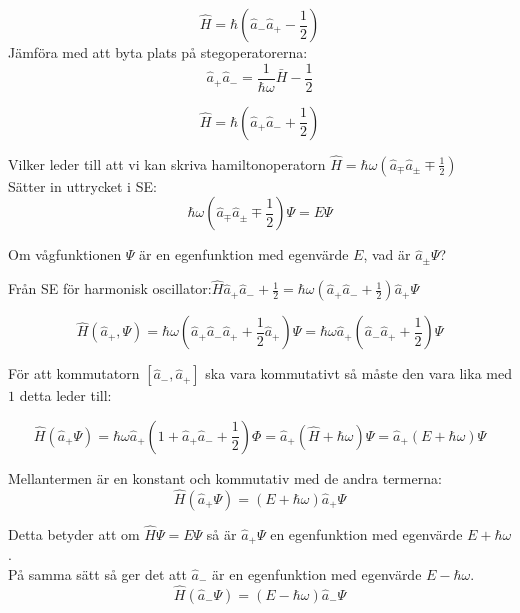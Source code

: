 \documentclass{article}
\begin{document}
\begin{equation}
  \hat{H}=\hbar(\hat{a}_-\hat{a}_+-\frac{1}{2})
\end{equation}
Jämföra med att byta plats på stegoperatorerna:
\begin{equation}
  \hat{a}_+\hat{a}_-=\frac{1}{\hbar\omega}\bar{H}-\frac{1}{2}
\end{equation}

\begin{equation}
  \hat{H}=\hbar(\hat{a}_+\hat{a}_-+\frac{1}{2})
\end{equation}

Vilker leder till att vi kan skriva hamiltonoperatorn $\hat{H}=\hbar\omega(\hat{a}_{\mp}\hat{a}_{\pm}\mp\frac{1}{2})$\\

Sätter in uttrycket i SE:
\begin{equation}
  \hbar\omega(\hat{a}_{\mp}\hat{a}_{\pm}\mp\frac{1}{2})\Psi=E\Psi
\end{equation}

Om vågfunktionen $\Psi$ är en egenfunktion med egenvärde $E$, vad är $\hat{a}_{\pm}\Psi$?

Från SE för harmonisk oscillator:\quad $\hat{H}\hat{a}_+\hat{a}_-+\frac{1}{2}=\hbar\omega(\hat{a}_+\hat{a}_-+\frac{1}{2})\hat{a}_+\Psi$

\begin{equation}
  \hat{H}(\hat{a}_+,\Psi)=\hbar\omega(\hat{a}_+\hat{a}_-\hat{a}_++\frac{1}{2}\hat{a}_+)\Psi=\hbar\omega\hat{a}_+(\hat{a}_-\hat{a}_++\frac{1}{2})\Psi
\end{equation}

För att kommutatorn $[\hat{a}_-,\hat{a}_+]$ ska vara kommutativt så måste den vara lika med $1$ detta leder till:

\begin{equation}
  \hat{H}(\hat{a}_+\Psi)=\hbar\omega\hat{a}_+(1+\hat{a}_+\hat{a}_-+\frac{1}{2})\Phi=\hat{a}_+(\hat{H}+\hbar\omega)\Psi=\hat{a}_+(E+\hbar\omega)\Psi
\end{equation}

Mellantermen är en konstant och kommutativ med de andra termerna:
\begin{equation}
  \hat{H}(\hat{a}_+\Psi)=(E+\hbar\omega)\hat{a}_+\Psi
\end{equation}

Detta betyder att om $\hat{H}\Psi=E\Psi$ så är $\hat{a}_+\Psi$ en egenfunktion med egenvärde $E+\hbar\omega$.\\
På samma sätt så ger det att $\hat{a}_-$ är en egenfunktion med egenvärde $E-\hbar\omega$.
\begin{equation}
  \hat{H}(\hat{a}_-\Psi)=(E-\hbar\omega)\hat{a}_-\Psi
\end{equation}
\end{document}

